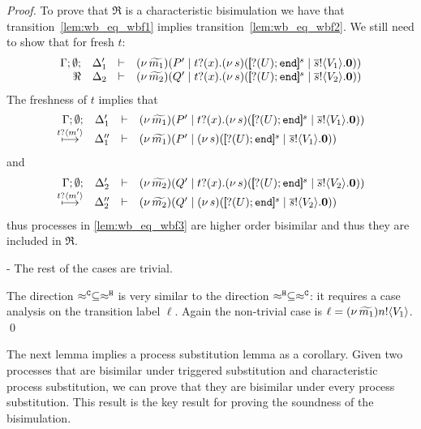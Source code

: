 \begin{proof}
	\noi To prove that $\Re$ is a characteristic bisimulation we
	have that transition~\eqref{lem:wb_eq_wbf1} implies transition~\eqref{lem:wb_eq_wbf2}.
	We still need to show that for fresh $t$:
%
	\begin{eqnarray}
		\mhorel{\Gamma}{\Delta_1'}{\newsp{\widetilde{m_1}}{P' \Par \fotrigger{t}{x}{s}{\btinp{U} \tinact}{V_1}}}
		{\Re}
		{\Delta_2}{}{\newsp{\widetilde{m_2}}{Q' \Par \fotrigger{t}{x}{s}{\btinp{U} \tinact}{V_2}}}
		\label{lem:wb_eq_wbf3}
	\end{eqnarray}
%
	The freshness of $t$ implies that
	\[
		\mhorel{\Gamma}{\Delta_1'}{\newsp{\widetilde{m_1}}{P' \Par \fotrigger{t}{x}{s}{\btinp{U} \tinact}{V_1}}}
		{\hby{\bactinp{t}{m'}}}
		{\Delta_1''}{}{\newsp{\widetilde{m_1}}{P' \Par \newsp{s}{\map{\btinp{U} \tinact}^{s} \Par \bout{\dual{s}}{V_1} \inact}}}
	\]
	\noi and
%
	\[
		\mhorel{\Gamma}{\Delta_2'}{\newsp{\widetilde{m_2}}{Q' \Par \fotrigger{t}{x}{s}{\btinp{U} \tinact}{V_2}}}
		{\hby{\bactinp{t}{m'}}}
		{\Delta_2''}{}{\newsp{\widetilde{m_2}}{Q' \Par \newsp{s}{\map{\btinp{U} \tinact}^{s} \Par \bout{\dual{s}}{V_2} \inact}}}
	\]
%
	\noi	thus processes in \eqref{lem:wb_eq_wbf3} are higher order bisimilar and
			thus they are included in $\Re$.
		

	\noi - The rest of the cases are trivial.

	\noi The direction $\approx^\mathtt{C} \subseteq \approx^\mathtt{H}$ is very similar to the
	direction $\approx^\mathtt{H} \subseteq \approx^\mathtt{C}$: it requires a case analysis
	on the transition label $\ell$. Again the non-trivial case is
	$\ell = (\nu\, \widetilde{m_1}) n ! \langle V_1 \rangle$.
	\qed
\end{proof}



The next lemma implies a process substitution lemma as a corollary.
Given two processes that are bisimilar under triggered substitution
and characteristic process substitution, we can prove that they are
bisimilar under every process substitution. This result is
the key result for proving the soundness of the bisimulation. 

